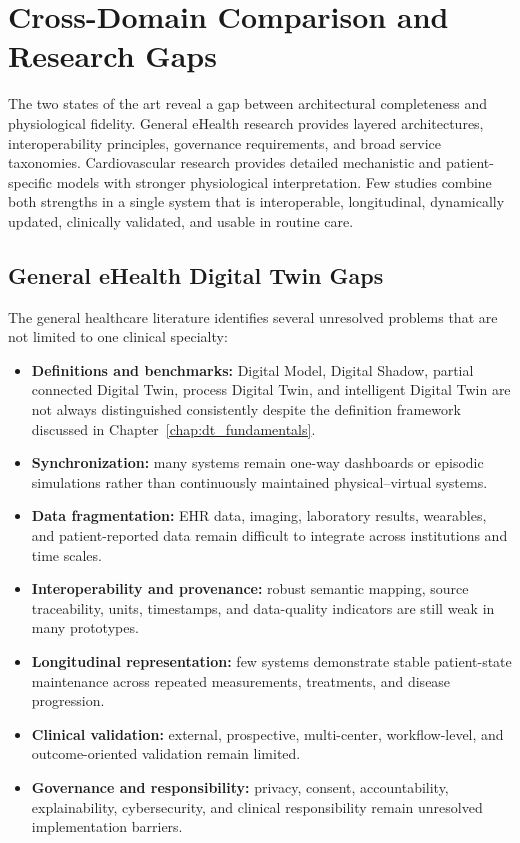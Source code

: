 \section{Cross-Domain Comparison and Research Gaps}
The two states of the art reveal a gap between architectural completeness and physiological fidelity. General eHealth research provides layered architectures, interoperability principles, governance requirements, and broad service taxonomies. Cardiovascular research provides detailed mechanistic and patient-specific models with stronger physiological interpretation. Few studies combine both strengths in a single system that is interoperable, longitudinal, dynamically updated, clinically validated, and usable in routine care.

\subsection{General eHealth Digital Twin Gaps}
The general healthcare literature identifies several unresolved problems that are not limited to one clinical specialty:
\begin{itemize}[leftmargin=*]
    \item \textbf{Definitions and benchmarks:} Digital Model, Digital Shadow, partial connected Digital Twin, process Digital Twin, and intelligent Digital Twin are not always distinguished consistently despite the definition framework discussed in Chapter~\ref{chap:dt_fundamentals}.
    \item \textbf{Synchronization:} many systems remain one-way dashboards or episodic simulations rather than continuously maintained physical--virtual systems.
    \item \textbf{Data fragmentation:} EHR data, imaging, laboratory results, wearables, and patient-reported data remain difficult to integrate across institutions and time scales.
    \item \textbf{Interoperability and provenance:} robust semantic mapping, source traceability, units, timestamps, and data-quality indicators are still weak in many prototypes.
    \item \textbf{Longitudinal representation:} few systems demonstrate stable patient-state maintenance across repeated measurements, treatments, and disease progression.
    \item \textbf{Clinical validation:} external, prospective, multi-center, workflow-level, and outcome-oriented validation remain limited.
    \item \textbf{Governance and responsibility:} privacy, consent, accountability, explainability, cybersecurity, and clinical responsibility remain unresolved implementation barriers.
\end{itemize}

